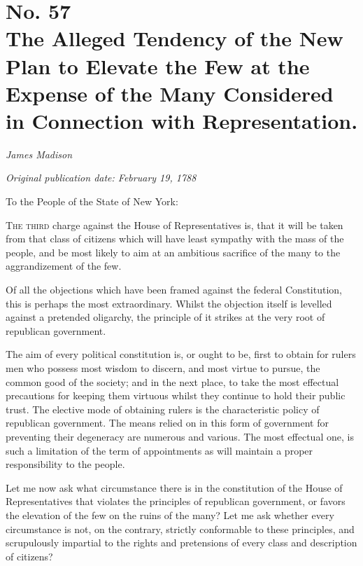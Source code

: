 \chapter[No. 57: The Alleged Tendency of the New Plan to Elevate the Few at the Expense of the Many Considered in Connection with Representation.]{No. 57\\ {\small The Alleged Tendency of the New Plan to Elevate the Few at the Expense of the Many Considered in Connection with Representation.}}

\textit{James Madison}

\textit{Original publication date: February 19, 1788}
\vspace{1cm}

To the People of the State of New York:
\vspace{.4cm}

\textsc{The third} charge against the House of Representatives is, that it will be taken from that class of citizens which will have least sympathy with the mass of the people, and be most likely to aim at an ambitious sacrifice of the many to the aggrandizement of the few.

Of all the objections which have been framed against the federal Constitution, this is perhaps the most extraordinary. 
Whilst the objection itself is levelled against a pretended oligarchy, the principle of it strikes at the very root of republican government.

The aim of every political constitution is, or ought to be, first to obtain for rulers men who possess most wisdom to discern, and most virtue to pursue, the common good of the society; and in the next place, to take the most effectual precautions for keeping them virtuous whilst they continue to hold their public trust. 
The elective mode of obtaining rulers is the characteristic policy of republican government. 
The means relied on in this form of government for preventing their degeneracy are numerous and various. 
The most effectual one, is such a limitation of the term of appointments as will maintain a proper responsibility to the people.

Let me now ask what circumstance there is in the constitution of the House of Representatives that violates the principles of republican government, or favors the elevation of the few on the ruins of the many? 
Let me ask whether every circumstance is not, on the contrary, strictly conformable to these principles, and scrupulously impartial to the rights and pretensions of every class and description of citizens?

